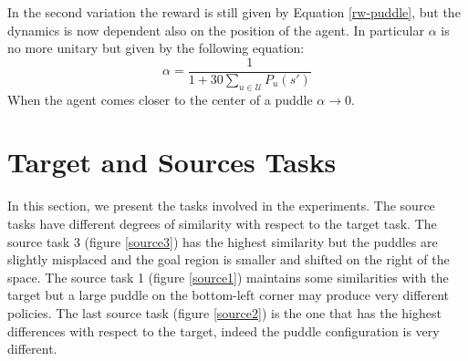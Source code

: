     \noindent In the second variation the reward is still given by Equation \ref{rw-puddle}, but the dynamics is now dependent also
    on the position of the agent. In particular $\alpha$ is no more unitary but given by the following equation:
    \begin{equation}
      \alpha = \frac{1}{1 + 30\sum_{u \in \mathcal{U}} P_{u}(s')}
    \end{equation}
    When the agent comes closer to the center of a puddle $\alpha \rightarrow 0$.

  \section{Target and Sources Tasks}
    \noindent In this section, we present the tasks involved in the experiments. The source tasks have different degrees
    of similarity with respect to the target task. The source task 3 (figure \ref{source3}) has the highest similarity
    but the puddles are slightly misplaced and the goal region is smaller and shifted on the right of the space. The source
    task 1 (figure \ref{source1}) maintains some similarities with the target but a large puddle on the bottom-left corner
    may produce very different policies. The last source task (figure \ref{source2}) is the one that has the highest
    differences with respect to the target, indeed the puddle configuration is very different.

